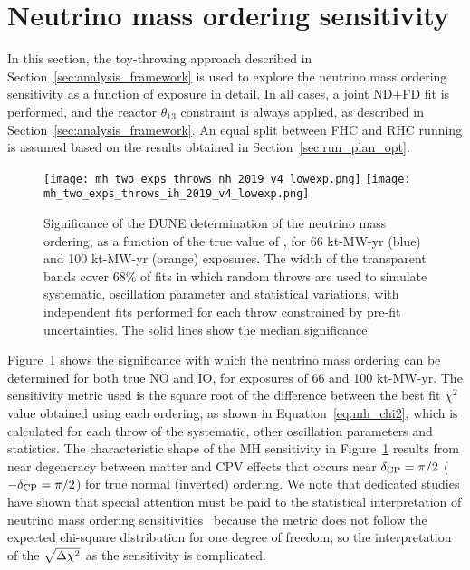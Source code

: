 \section{Neutrino mass ordering sensitivity}
\label{sec:mh_sens}

In this section, the toy-throwing approach described in Section~\ref{sec:analysis_framework} is used to explore the neutrino mass ordering sensitivity as a function of exposure in detail. In all cases, a joint ND+FD fit is performed, and the reactor $\theta_{13}$ constraint is always applied, as described in Section~\ref{sec:analysis_framework}. An equal split between FHC and RHC running is assumed based on the results obtained in Section~\ref{sec:run_plan_opt}.

\begin{figure}[htbp]
  \centering
  \texttt{[image: mh\_two\_exps\_throws\_nh\_2019\_v4\_lowexp.png]}
  \texttt{[image: mh\_two\_exps\_throws\_ih\_2019\_v4\_lowexp.png]}
  \caption{Significance of the DUNE determination of the neutrino mass ordering, as a function of the true value of \deltacp, for 66 kt-MW-yr (blue) and 100 kt-MW-yr (orange) exposures. The width of the transparent bands cover 68\% of fits in which random throws are used to simulate systematic, oscillation parameter and statistical variations, with independent fits performed for each throw constrained by pre-fit uncertainties. The solid lines show the median significance.}
  \label{fig:mh_bands}
\end{figure}
Figure~\ref{fig:mh_bands} shows the significance with which the neutrino mass ordering can be determined for both true NO and IO, for exposures of 66 and 100 kt-MW-yr. The sensitivity metric used is the square root of the difference between the best fit $\chi^{2}$ value obtained using each ordering, as shown in Equation~\ref{eq:mh_chi2}, which is calculated for each throw of the systematic, other oscillation parameters and statistics. The characteristic shape of the MH sensitivity in Figure~\ref{fig:mh_bands} results from near degeneracy between matter and CPV effects that occurs near $\delta_{\rm CP}=\pi/2$ ($-\delta_{\rm CP}=\pi/2$) for true normal (inverted) ordering. We note that dedicated studies have shown that special attention must be paid to the statistical interpretation of neutrino mass ordering sensitivities~\cite{Ciuffoli:2013rza,Qian:2012zn,Blennow:2013oma} because the \dchisq metric does not follow the expected chi-square distribution for one degree of freedom, so the interpretation of the $\sqrt{\Delta\chi^{2}}$ as the sensitivity is complicated.

